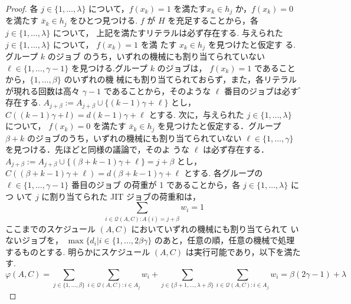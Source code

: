 \documentclass[12pt]{optlab-bachelor}
\begin{document}
\begin{proof}
  各 $j\in \{1,\ldots,\lambda\}$ について，$f(x_k)=1$ を満たす$x_k \in
  h_j$ か，$f(x_k)=0$ を満たす $\bar x_k \in h_j$ をひとつ見つける. $f$ が $H$ を充足することから，各 $j \in \{1,\ldots,\lambda\}$ について， 上記を満たすリテラルは必ず存在する.
  与えられた $j \in \{1,\ldots,\lambda \}$ について， $f(x_k) = 1$ を満
  たす $x_k \in h_j$ を見つけたと仮定す る.グループ $k$ のジョブ
  のうち，いずれの機械にも割り当てられていない $\ell \in
  \{1,\ldots,\gamma - 1\}$ を見つける.グループ $k$ のジョブは，
  $f (x_k) = 1$ であることから，$\{1,\ldots, \beta \}$ のいずれの機
  械にも割り当てられておらず，また，各リテラルが現れる回数は高々
  $\gamma − 1$ であることから，そのような $\ell$ 番目のジョブは必す
  ゙存在する. $A_{j + \beta} := A_{j + \beta} \cup \{ (k − 1) \gamma +
  \ell\}$ とし， $C((k − 1)\gamma + l) = d(k−1)\gamma + \ell$ とする.
  次に，与えられた $j \in \{1,\ldots,\lambda\}$ について， $f(x_k) = 0$
  を満たす $\bar x_k \in h_j$ を見つけたと仮定する．グループ $\beta
  + k$ のジョブのうち，いずれの機械にも割り当てられていない $\ell
  \in \{1,\ldots,\gamma\}$ を見つける．先ほどと同様の議論で，そのよ
  うな $\ell$ は必ず存在する． $A_{j + \beta} := A_{j + \beta} \cup \{
  (\beta + k − 1 ) \gamma + \ell \} = j + \beta$ とし，$C((\beta + k −
  1) \gamma + \ell) = d(\beta + k − 1)\gamma + \ell$ とする.
  各グループの $\ell \in \{1,\ldots,\gamma − 1\}$ 番目のジョブ
  の荷重が 1 であることから，各 $j \in \{1,\ldots, \lambda \}$ につ
  いて $j$ に割り当てられた JIT ジョブの荷重和は，
  $$\displaystyle \sum_{i \in \mathcal{Q}(A,C):A(i) = j + \beta}w_i =
  1$$
  ここまでのスケジュール $(A, C)$ においていずれの機械にも割り当てられて
  いないジョブを， $\max\{d_i | i \in \{1,\ldots, 2\beta \gamma\}$ のあと，任意の順，任意の機械で処理するものとする.
  明らかにスケジュール $(A, C)$ は実行可能であり，以下を満たす.
  \begin{displaymath}
    \displaystyle \varphi(A,C) = \sum_{j \in
    \{1,\ldots,\beta\}} \sum_{i \in \mathcal{Q}(A,C):i \in
    A_j}w_i + \sum_{j \in
    \{\beta + 1,\ldots,\lambda + \beta\}} \sum_{i \in \mathcal{Q}(A,C):i \in
    A_j}w_i =
    \beta(2\gamma - 1) + \lambda
  \end{displaymath}
\end{proof}
\end{document}
